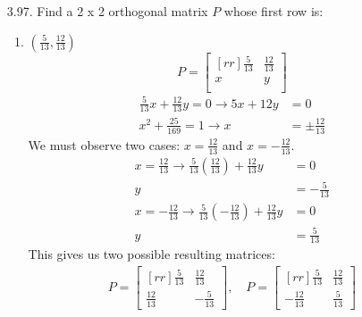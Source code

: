 \documentclass[12pt]{article}
\begin{document}
\begin{enumerate}
\begin{enumerate}
	
	\item $A^2$
	\begin{proof}
	Assume that $A$ is symmetric, then $A=A^T$. We show that $A^2=(A^2)^T$.\\
	Note that $A^2 = A*A$. Since $A$ is symmetric, then $A*A=A^T*A^T$ and by the distributive law,$A^T*A^T=(A*A)^T=(A^2)^T$.
	\end{proof}	
	
	\end{enumerate}

\pagebreak
\item [3.97.] Find a 2 x 2 orthogonal matrix $P$ whose first row is:
	\begin{enumerate}
	\item $(\frac{5}{13}, \frac{12}{13})$\\
	\[ P= \begin{bmatrix}[rr] \frac{5}{13} & \frac{12}{13}\\ x & y\\ \end{bmatrix}\]
	\begin{align*}
	\frac{5}{13}x + \frac{12}{13}y = 0 \rightarrow 5x+12y &= 0\\
	x^2 + \frac{25}{169} = 1 \rightarrow x &= \pm \frac{12}{13}
	\end{align*}
	We must observe two cases: $x= \frac{12}{13}$ and $x= -\frac{12}{13}$.
	\begin{align*}
	x=\frac{12}{13} \rightarrow \frac{5}{13}(\frac{12}{13}) + \frac{12}{13}y &= 0\\
	y &= -\frac{5}{13}\\
	x=-\frac{12}{13} \rightarrow \frac{5}{13}(-\frac{12}{13}) + \frac{12}{13}y &= 0\\
	y &= \frac{5}{13}
	\end{align*}
	This gives us two possible resulting matrices:
	\begin{align*}
	P= \begin{bmatrix}[rr] \frac{5}{13} & \frac{12}{13}\\ \frac{12}{13} & -\frac{5}{13} \end{bmatrix}, \quad
	P= \begin{bmatrix}[rr] \frac{5}{13} & \frac{12}{13}\\ -\frac{12}{13} & \frac{5}{13} \end{bmatrix}
	\end{align*}
	\end{enumerate}


\end{enumerate}
\end{document}
